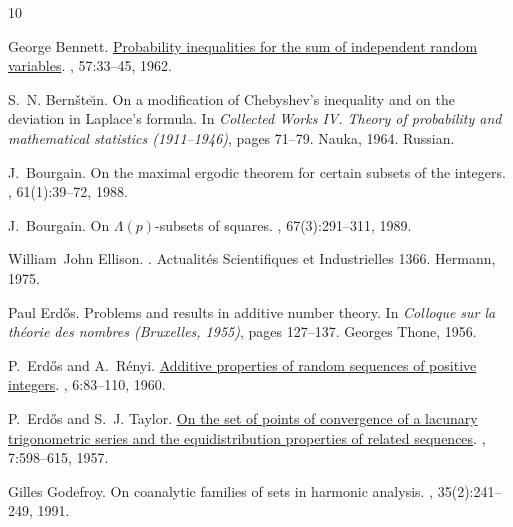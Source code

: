 \documentclass[a4paper]{article}
\begin{document}
\def\cprime{$'$}\def\bibmath{disponible \`a la biblioth\`eque de
  math\'ematiques}\def\bibirem{disponible \`a la biblioth\`eque de
  l'IREM}\def\BUL{disponible \`a la BU Lettres}\def\BUS{disponible \`a la BU
  Sciences}\ifx\iflanguage\undefined{}\fi
\begin{thebibliography}{10}

George Bennett.
\newblock \href{http://dx.doi.org/10.2307/2282438} {Probability inequalities
  for the sum of independent random variables}.
, 57:33--45, 1962.

S.~N. Bern{\v{s}}te{\u\i}n.
\newblock On a modification of {C}hebyshev's inequality and on the deviation in
  {L}aplace's formula.
\newblock In {\em Collected {W}orks {I}{V}. {T}heory of probability and
  mathematical statistics (1911--1946)}, pages 71--79. Nauka, 1964.
\newblock Russian.

J.~Bourgain.
\newblock On the maximal ergodic theorem for certain subsets of the integers.
, 61(1):39--72, 1988.

J.~Bourgain.
\newblock On ${\Lambda}(p)$-subsets of squares.
, 67(3):291--311, 1989.

William~John Ellison.
.
\newblock Actualit\'es Scientifiques et Industrielles 1366. Hermann, 1975.

Paul Erd\H{o}s.
\newblock Problems and results in additive number theory.
\newblock In {\em Colloque sur la th\'eorie des nombres (Bruxelles, 1955)},
  pages 127--137. Georges Thone, 1956.

P.~Erd{\H{o}}s and A.~R{\'e}nyi.
\newblock \href{http://matwbn.icm.edu.pl/ksiazki/aa/aa6/aa619.pdf}{Additive
  properties of random sequences of positive integers}.
, 6:83--110, 1960.

P.~Erd{\H{o}}s and S.~J. Taylor.
\newblock \href{http://dx.doi.org/10.1112/plms/s3-7.1.598} {On the set of
  points of convergence of a lacunary tri\-gono\-metric series and the
  equidistribution properties of related sequences}.
, 7:598--615, 1957.

Gilles Godefroy.
\newblock On coanalytic families of sets in harmonic analysis.
, 35(2):241--249, 1991.


\end{thebibliography}
\end{document}
